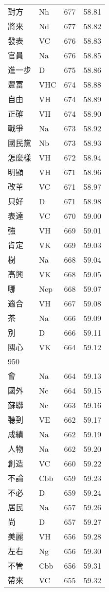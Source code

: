 \documentclass[twocolumn]{book}
\begin{document}
\begin{supertabular}{llrr}
對方 & Nh & 677 &  58.81\\
將來 & Nd & 677 &  58.82\\
發表 & VC & 676 &  58.83\\
官員 & Na & 676 &  58.85\\
進一步 & D & 675 &  58.86\\
豐富 & VHC & 674 &  58.88\\
自由 & VH & 674 &  58.89\\
正確 & VH & 674 &  58.90\\
戰爭 & Na & 673 &  58.92\\
國民黨 & Nb & 673 &  58.93\\
怎麼樣 & VH & 672 &  58.94\\
明顯 & VH & 671 &  58.96\\
改革 & VC & 671 &  58.97\\
只好 & D & 671 &  58.98\\
表達 & VC & 670 &  59.00\\
強 & VH & 669 &  59.01\\
肯定 & VK & 669 &  59.03\\
樹 & Na & 668 &  59.04\\
高興 & VK & 668 &  59.05\\
哪 & Nep & 668 &  59.07\\
適合 & VH & 667 &  59.08\\
茶 & Na & 666 &  59.09\\
別 & D & 666 &  59.11\\
關心 & VK & 664 &  59.12\\
950\\
會 & Na & 664 &  59.13\\
國外 & Nc & 664 &  59.15\\
蘇聯 & Nc & 663 &  59.16\\
聽到 & VE & 662 &  59.17\\
成績 & Na & 662 &  59.19\\
人物 & Na & 662 &  59.20\\
創造 & VC & 660 &  59.22\\
不論 & Cbb & 659 &  59.23\\
不必 & D & 659 &  59.24\\
居民 & Na & 657 &  59.26\\
尚 & D & 657 &  59.27\\
美麗 & VH & 656 &  59.28\\
左右 & Ng & 656 &  59.30\\
不管 & Cbb & 656 &  59.31\\
帶來 & VC & 655 &  59.32\\

\end{supertabular}
\end{document}
